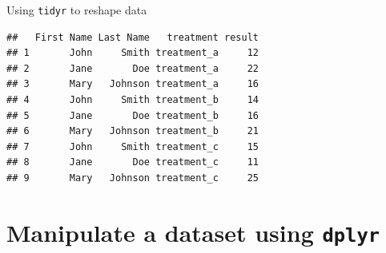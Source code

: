 \documentclass[14pt,ignorenonframetext,]{bredelebeamer}
\newenvironment{Shaded}{\begin{snugshade}}{\end{snugshade}}
\newcommand{\KeywordTok}[1]{\textcolor[rgb]{0.94,0.87,0.69}{#1}}
\newcommand{\DataTypeTok}[1]{\textcolor[rgb]{0.87,0.87,0.75}{#1}}
\newcommand{\DecValTok}[1]{\textcolor[rgb]{0.86,0.86,0.80}{#1}}
\newcommand{\StringTok}[1]{\textcolor[rgb]{0.80,0.58,0.58}{#1}}
\newcommand{\OperatorTok}[1]{\textcolor[rgb]{0.94,0.94,0.82}{#1}}
\newcommand{\NormalTok}[1]{\textcolor[rgb]{0.80,0.80,0.80}{#1}}
\begin{document}
\begin{frame}[fragile]{Using \texttt{tidyr} to reshape data}

\begin{Shaded}
\end{Shaded}

\begin{verbatim}
##   First Name Last Name   treatment result
## 1       John     Smith treatment_a     12
## 2       Jane       Doe treatment_a     22
## 3       Mary   Johnson treatment_a     16
## 4       John     Smith treatment_b     14
## 5       Jane       Doe treatment_b     16
## 6       Mary   Johnson treatment_b     21
## 7       John     Smith treatment_c     15
## 8       Jane       Doe treatment_c     11
## 9       Mary   Johnson treatment_c     25
\end{verbatim}

\end{frame}

\section{\texorpdfstring{Manipulate a dataset using
\texttt{dplyr}}{Manipulate a dataset using dplyr}}\label{manipulate-a-dataset-using-dplyr}
\end{document}
